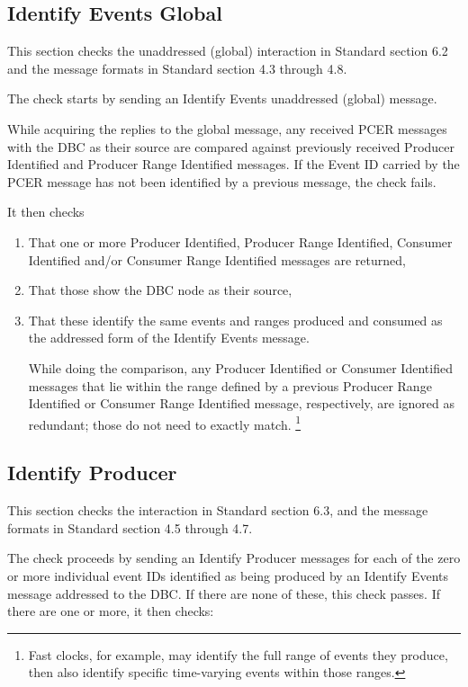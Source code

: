 \subsection{Identify Events Global}

This section checks the unaddressed (global) interaction in Standard section 6.2 and
the message formats in Standard section 4.3 through 4.8.

The check starts by sending an Identify Events unaddressed (global) message.

While acquiring the replies to the global message,
any received PCER messages with the DBC as their source are compared against
previously received Producer Identified and Producer Range Identified messages.
If the Event ID carried by the PCER message has not been identified by 
a previous message, the check fails.

It then checks

\begin{enumerate}
\item That one or more Producer Identified, Producer Range Identified, 
        Consumer Identified and/or Consumer Range Identified messages are returned,
\item That those show the DBC node as their source,
\item That these identify the same events and ranges produced and consumed as the 
        addressed form of the Identify Events message.

        While doing the comparison, any Producer Identified or Consumer Identified
        messages that lie within the range defined by a previous Producer Range 
        Identified or Consumer Range Identified message, respectively, are ignored
        as redundant; those do not need to exactly match.
        \footnote{Fast clocks, for example, may identify the full range
                    of events they produce, then also identify specific
                    time-varying events within those ranges.}
\end{enumerate}

\subsection{Identify Producer}

This section checks the interaction in Standard section 6.3, and
the message formats in Standard section 4.5 through 4.7.

The check proceeds by sending an Identify Producer messages for each of
the zero or more individual event IDs identified as being produced by an Identify Events message 
addressed to the DBC. If there are none of these, this check passes. If there
are one or more, it then checks:

